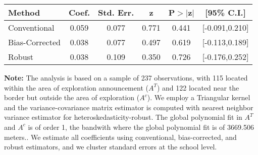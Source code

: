 \begin{table}[htbp]\centering
 \footnotesize 
\begin{tabular}{lccccc}
\hline\hline
Method & Coef. & Std. Err. & z & P$>|$z$|$ & [95\% C.I.] \\ 
\hline \hline  
Conventional & 0.059 & 0.077 & 0.771 & 0.441 & [-0.091,0.210] \\ 
 Bias-Corrected & 0.038 & 0.077 & 0.497 & 0.619 & [-0.113,0.189] \\ 
Robust & 0.038 & 0.109 & 0.350 & 0.726 & [-0.176,0.252] \\ 
  \hline\hline
\end{tabular}
\label{table:rd}
\begin{tablenotes} 
  \justifying \tiny \textbf{Note: }    
   The analysis is based on a sample of 237 observations, with 115 located within the area of exploration announcement ($A^{T}$) and 122 located near the border but outside the area of exploration  ($A^{c}$). 
           We employ a Triangular kernel and the variance-covariance matrix estimator is computed with nearest neighbor variance estimator for heteroskedasticity-robust. The global polynomial fit in  $A^{T}$ and $A^{c}$ is of order 1, the bandwith where the global polynomial fit is of 3669.506 meters.. We estimate all coefficients using conventional, bias-corrected, and robust estimators, and we cluster standard errors at the school level. \end{tablenotes} 
 \end{table} 
